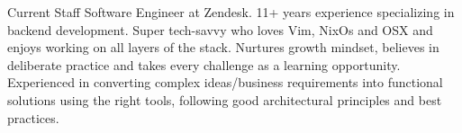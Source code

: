 

\begin{cvparagraph}

  Current Staff Software Engineer at Zendesk. 11+ years experience specializing in backend development. Super tech-savvy who loves Vim, NixOs and OSX and enjoys working on all layers of the stack. Nurtures growth mindset, believes in deliberate practice and takes every challenge as a learning opportunity. Experienced in converting complex ideas/business requirements into functional solutions using the right tools, following good architectural principles and best practices.
\end{cvparagraph}
